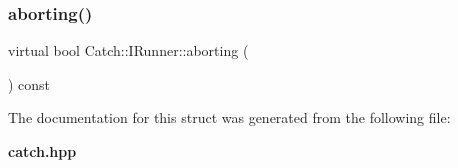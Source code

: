 \subsubsection{aborting()}
{\footnotesize\ttfamily virtual bool Catch\+::\+I\+Runner\+::aborting (\begin{DoxyParamCaption}{ }\end{DoxyParamCaption}) const\hspace{0.3cm}{\ttfamily [pure virtual]}}



The documentation for this struct was generated from the following file\+:\begin{DoxyCompactItemize}
\item 
\textbf{ catch.\+hpp}\end{DoxyCompactItemize}
